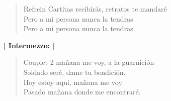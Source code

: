 \begin{verse}{Refrein}
Cartitas recibir\'{a}s, \hspace{5em} retratos te mandar\'{e} \\
Pero a mi persona nunca la tendras\\
Pero a mi persona nunca la tendras\hspace{3em}\hspace{1.5em}\hspace{3em}\hspace{1.5em}
\end{verse}
\textbf{[ Intermezzo: ]}\\
\begin{verse}{Couplet 2}
ma\~{n}ana me voy, a la guarnici\'{o}n\\
Soldado ser\'{e}, dame tu bendici\'{o}n.\\
Hoy estoy aqui, ma\~{n}ana me voy\\
Pasado ma\~{n}ana donde me encontrar\'{e}.\hspace{4em}\hspace{2em}\hspace{4em}\hspace{2em}\\
\end{verse}

